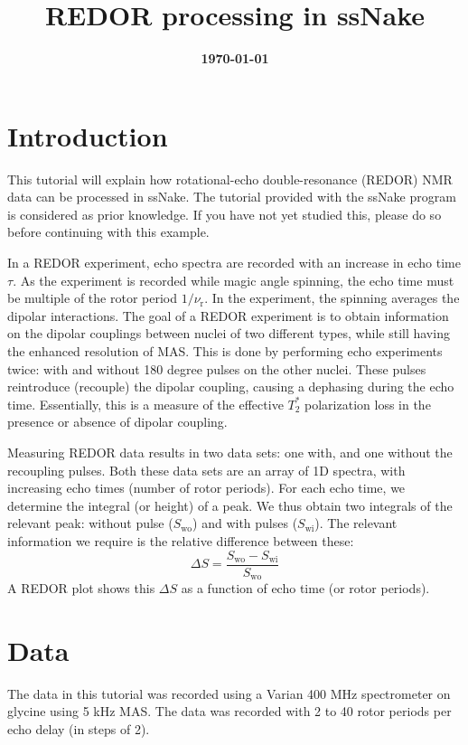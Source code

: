\documentclass[11pt,a4paper]{article}
\title{\color{black}\fontfamily{SourceSansPro-LF}\bfseries REDOR processing in ssNake}
\author{}
\date{\color{black}\fontfamily{SourceSansPro-LF}\bfseries \today}
\begin{document}

\maketitle

\section{Introduction}
This tutorial will explain how rotational-echo double-resonance (REDOR) NMR data can be processed in ssNake.
The tutorial provided with the ssNake program is considered as prior knowledge.
If you have not yet studied this, please do so before continuing with this example.

In a REDOR experiment, echo spectra are recorded with an increase in echo time $\tau$.
As the experiment is recorded while magic angle spinning, the echo time must be multiple of the rotor period $1/\nu_\text{r}$.
In the experiment, the spinning averages the dipolar interactions.
The goal of a REDOR experiment is to obtain information on the dipolar couplings between nuclei of two different types, while still having the enhanced resolution of MAS.
This is done by performing echo experiments twice: with and without 180 degree pulses on the other nuclei.
These pulses reintroduce (recouple) the dipolar coupling, causing a dephasing during the echo time.
Essentially, this is a measure of the effective $T_2^*$ polarization loss in the presence or absence of dipolar coupling.

Measuring REDOR data results in two data sets: one with, and one without the recoupling pulses.
Both these data sets are an array of 1D spectra, with increasing echo times (number of rotor periods).
For each echo time, we determine the integral (or height) of a peak.
We thus obtain two integrals of the relevant peak: without pulse ($S_\text{wo}$) and with pulses ($S_\text{wi}$).
The relevant information we require is the relative difference between these:
\begin{equation*}
  \Delta S = \frac{S_\text{wo} - S_\text{wi}}{S_\text{wo}}
\end{equation*}
A REDOR plot shows this $\Delta S$ as a function of echo time (or rotor periods).


\section{Data}
The data in this tutorial was recorded using a Varian 400 MHz spectrometer on glycine using 5 kHz MAS.
The data was recorded with 2 to 40 rotor periods per echo delay (in steps of 2).
\end{document}
